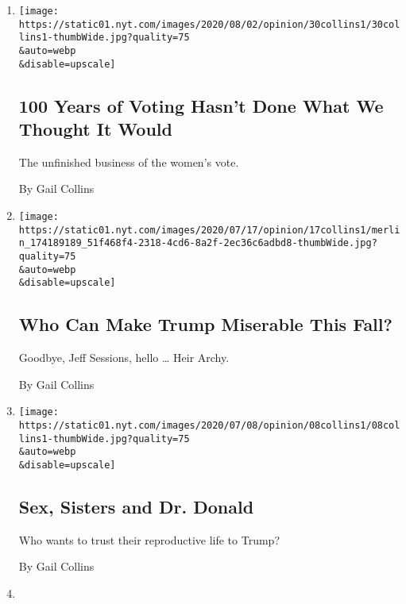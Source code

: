\begin{enumerate}
\def\labelenumi{\arabic{enumi}.}
\item
  \href{/2020/07/30/opinion/19th-amendment-women-suffrage.html}{}

  \texttt{[image: https://static01.nyt.com/images/2020/08/02/opinion/30collins1/30collins1-thumbWide.jpg?quality=75\\\&auto=webp\\\&disable=upscale]}

  \hypertarget{100-years-of-voting-hasnt-done-what-we-thought-it-would}{%
  \subsection{100 Years of Voting Hasn't Done What We Thought It
  Would}\label{100-years-of-voting-hasnt-done-what-we-thought-it-would}}

  The unfinished business of the women's vote.

  By Gail Collins
\item
  \href{/2020/07/15/opinion/trump-sessions-senate.html}{}

  \texttt{[image: https://static01.nyt.com/images/2020/07/17/opinion/17collins1/merlin\_174189189\_51f468f4-2318-4cd6-8a2f-2ec36c6adbd8-thumbWide.jpg?quality=75\\\&auto=webp\\\&disable=upscale]}

  \hypertarget{who-can-make-trump-miserable-this-fall}{%
  \subsection{Who Can Make Trump Miserable This
  Fall?}\label{who-can-make-trump-miserable-this-fall}}

  Goodbye, Jeff Sessions, hello \ldots{} Heir Archy.

  By Gail Collins
\item
  \href{/2020/07/08/opinion/birth-control-supreme-court.html}{}

  \texttt{[image: https://static01.nyt.com/images/2020/07/08/opinion/08collins1/08collins1-thumbWide.jpg?quality=75\\\&auto=webp\\\&disable=upscale]}

  \hypertarget{sex-sisters-and-dr-donald}{%
  \subsection{Sex, Sisters and Dr.
  Donald}\label{sex-sisters-and-dr-donald}}

  Who wants to trust their reproductive life to Trump?

  By Gail Collins
\item
  \href{/interactive/2020/07/01/opinion/4th-of-july-quiz.html}{}


\end{enumerate}
